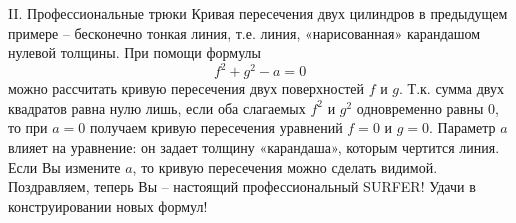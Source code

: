 \begin{surferPage}{II. Профессиональные трюки}
Кривая пересечения двух цилиндров в предыдущем примере – бесконечно тонкая линия, т.е. линия, «нарисованная» карандашом нулевой толщины. При помощи формулы
\[ f^2+g^2-a=0\]
можно рассчитать кривую пересечения двух поверхностей $f$ и $g$. Т.к. сумма двух квадратов равна нулю лишь, если оба слагаемых $f^2$ и $g^2$ одновременно равны $0$, то при $a = 0$ получаем кривую пересечения уравнений $f=0$ и $g=0$. Параметр $a$ влияет на уравнение: он задает толщину «карандаша», которым чертится линия. Если Вы измените $a$, то кривую пересечения можно сделать видимой.
\newline \newline
Поздравляем, теперь Вы – настоящий профессиональный SURFER! Удачи в конструировании новых формул!
\end{surferPage}
